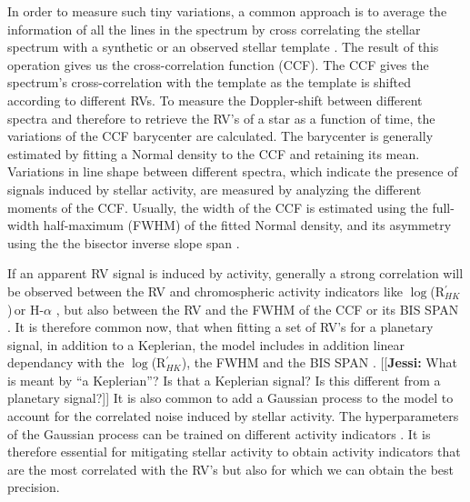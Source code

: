 \documentclass[11pt, oneside]{article}
\def\logrhk{$\log$(R$^{\prime}_{HK}$)}
\newcommand{\jessi}[1]{{\color{Purple}[[\textbf{Jessi: }#1]]}}
\begin{document}
In order to measure such tiny variations, a common approach is to average the information of all the lines in the spectrum by cross correlating the stellar spectrum with a synthetic \citep[][]{Baranne-1996,Pepe-2002a} or an observed stellar template \citep[][]{Anglada-Escude-2012}. The result of this operation gives us the cross-correlation function (CCF).  The CCF gives the spectrum's cross-correlation with the template as the template is shifted according to different RVs.
%
To measure the Doppler-shift between different spectra and therefore to retrieve the RV's of a star as a function of time, the variations of the CCF barycenter are calculated. 
The barycenter is generally estimated by fitting a Normal density to the CCF and retaining its mean. Variations in line shape between different spectra, which indicate the presence of signals induced by stellar activity, are measured by analyzing the different moments of the CCF. Usually, the width of the CCF is estimated using the full-width half-maximum (FWHM) of the fitted Normal density, and its asymmetry using the the bisector inverse slope span \citep[BIS SPAN,][]{Queloz-2001}.


If an apparent RV signal is induced by activity, generally a strong correlation will be observed between the RV and chromospheric activity indicators like \logrhk\,or H-$\alpha$ \citep{Boisse-2009,Dumusque-2012,Robertson-2014}, but also between the RV and the FWHM of the CCF or its BIS SPAN \citep[][]{Queloz-2001,Boisse-2009,Queloz-2009,Dumusque-2016a}. 
%
It is therefore common now, that when fitting a set of RV's for a planetary signal, in addition to a Keplerian, the model includes in addition linear dependancy with the \logrhk, the FWHM and the BIS SPAN \citep{Dumusque:2017aa,Feng:2017aa}. \jessi{What is meant by ``a Keplerian''?  Is that a Keplerian signal?  Is this different from a planetary signal?}
%
It is also common to add a Gaussian process to the model to account for the correlated noise induced by stellar activity. The hyperparameters of the Gaussian process can be trained on different activity indicators \citep{Haywood-2014,Rajpaul-2015}. It is therefore essential for mitigating stellar activity to obtain activity indicators that are the most correlated with the RV's but also for which we can obtain the best precision.
\end{document}
